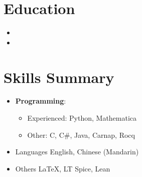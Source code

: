 \documentclass{curriculum-vitae}
\author{Ian Chi}
\begin{document}
\maketitle

\section{Education}
\begin{itemize}
  \item
  \item
    {}
\end{itemize}

\section{Skills Summary}
\begin{itemize}
  \item
    \textbf{Programming}:

    \begin{itemize}
      \item Experienced: Python, Mathematica

      \item Other: C, C\#, Java, Carnap, Rocq
    \end{itemize}

  \item
    \begin{itemshortlist}{Languages}
      English, Chinese (Mandarin)
    \end{itemshortlist}

  \item
    \begin{itemshortlist}{Others}
      \LaTeX, LT Spice, Lean
    \end{itemshortlist}
\end{itemize}
\end{document}
